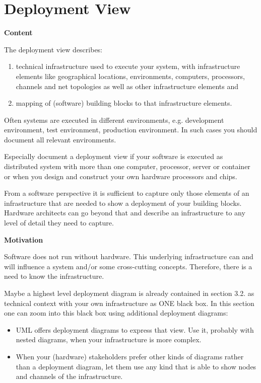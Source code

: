 \hypertarget{section-deployment-view}{%
\section{Deployment View}\label{section-deployment-view}}

\textbf{Content}

The deployment view describes:

\begin{enumerate}
\def\labelenumi{\arabic{enumi}.}
\item
  technical infrastructure used to execute your system, with
  infrastructure elements like geographical locations, environments,
  computers, processors, channels and net topologies as well as other
  infrastructure elements and
\item
  mapping of (software) building blocks to that infrastructure elements.
\end{enumerate}

Often systems are executed in different environments, e.g. development
environment, test environment, production environment. In such cases you
should document all relevant environments.

Especially document a deployment view if your software is executed as
distributed system with more than one computer, processor, server or
container or when you design and construct your own hardware processors
and chips.

From a software perspective it is sufficient to capture only those
elements of an infrastructure that are needed to show a deployment of
your building blocks. Hardware architects can go beyond that and
describe an infrastructure to any level of detail they need to capture.

\textbf{Motivation}

Software does not run without hardware. This underlying infrastructure
can and will influence a system and/or some cross-cutting concepts.
Therefore, there is a need to know the infrastructure.

Maybe a highest level deployment diagram is already contained in section
3.2. as technical context with your own infrastructure as ONE black box.
In this section one can zoom into this black box using additional
deployment diagrams:

\begin{itemize}
\item
  UML offers deployment diagrams to express that view. Use it, probably
  with nested diagrams, when your infrastructure is more complex.
\item
  When your (hardware) stakeholders prefer other kinds of diagrams
  rather than a deployment diagram, let them use any kind that is able
  to show nodes and channels of the infrastructure.
\end{itemize}

